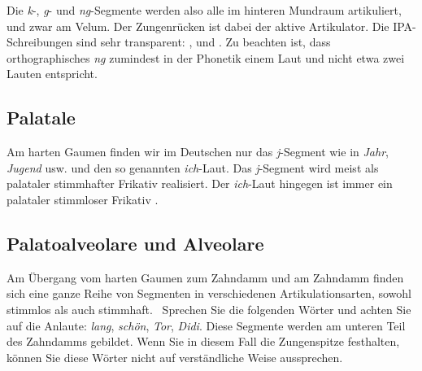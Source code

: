 Die \textit{k}-, \textit{g}- und \textit{ng}-Segmente werden also alle im hinteren Mundraum artikuliert, und zwar am Velum.
Der Zungenrücken ist dabei der aktive Artikulator.
Die IPA-Schreibungen sind sehr transparent: \textipa{[k]}, \textipa{[g]} und \textipa{[N]}.
Zu beachten ist, dass orthographisches \textit{ng} zumindest in der Phonetik einem Laut und nicht etwa zwei Lauten entspricht.

\subsection{Palatale}


Am harten Gaumen finden wir im Deutschen nur das \textit{j}-Segment wie in \textit{Jahr}, \textit{Jugend} usw. und den so genannten \textit{ich}-Laut.
Das \textit{j}-Segment wird meist als palataler stimmhafter Frikativ \textipa{[J]} realisiert.
Der \textit{ich}-Laut hingegen ist immer ein palataler stimmloser Frikativ \textipa{[\c{c}]}.

\subsection{Palatoalveolare und Alveolare}

\label{sec:palatoalveolarealveolare}


Am Übergang vom harten Gaumen zum Zahndamm und am Zahndamm finden sich eine ganze Reihe von Segmenten in verschiedenen Artikulationsarten, sowohl stimmlos als auch stimmhaft.
\TuBegin~Sprechen Sie die folgenden Wörter und achten Sie auf die Anlaute: \textit{lang}, \textit{schön}, \textit{Tor}, \textit{Didi}.
Diese Segmente werden am unteren Teil des Zahndamms gebildet.
Wenn Sie in diesem Fall die Zungenspitze festhalten, können Sie diese Wörter nicht auf verständliche Weise aussprechen.

